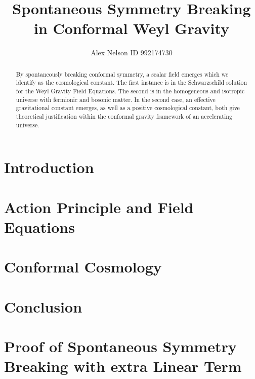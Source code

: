 \documentclass{amsart}
\title{Spontaneous Symmetry Breaking in Conformal Weyl Gravity}
\author{Alex Nelson ID 992174730}
\numberwithin{equation}{section}
\begin{document}
\maketitle
\begin{abstract}
By spontaneously breaking conformal symmetry, a scalar field emerges
which we identify as the cosmological constant. The first instance is
in the Schwarzschild solution for the Weyl Gravity Field
Equations. The second is in the homogeneous and isotropic universe
with fermionic and bosonic matter. In the second case, an effective
gravitational constant emerges, as well as a positive cosmological
constant, both give theoretical justification within the conformal
gravity framework of an accelerating universe.
\end{abstract} 

\section{Introduction}

\section{Action Principle and Field Equations}

\section{Conformal Cosmology}

\section{Conclusion}

\appendix

%
\section{Proof of Spontaneous Symmetry Breaking with extra Linear
  Term}



\end{document}
